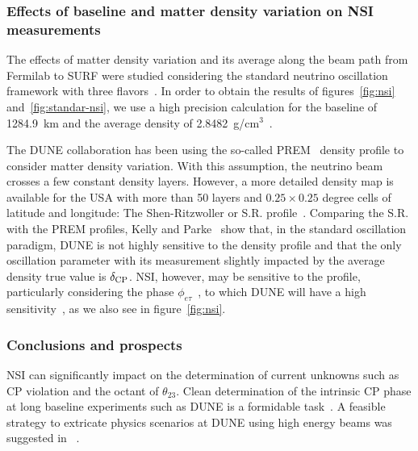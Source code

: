 \subsubsection{Effects of baseline and matter density variation on NSI measurements}\label{ssec:matter}
The effects of matter density variation and its average along the beam path from Fermilab to SURF were studied considering the standard neutrino oscillation framework with three flavors~\cite{Roe:2017zdw,Kelly:2018kmb}. In order to obtain the results of figures~\ref{fig:nsi} and~\ref{fig:standar-nsi}, we use a high precision calculation for the baseline of 1284.9~km and the average density of 2.8482~g/cm$^3$~\cite{Roe:2017zdw}.

The DUNE collaboration has been using the so-called PREM~\cite{Dziewonski:1981xy,PREM2} density profile to consider matter density variation. With this assumption, the neutrino beam crosses a few constant density layers.
However, a more detailed density map is available for the USA with more than 50 layers and $0.25 \times 0.25$ degree cells of latitude and longitude: The Shen-Ritzwoller or S.R. profile~\cite{SR:2016,Roe:2017zdw}. Comparing the S.R. with the PREM profiles, Kelly and Parke~\cite{Kelly:2018kmb} show that, in the standard oscillation paradigm, DUNE is not highly sensitive to the density profile and that the only oscillation parameter with its measurement slightly impacted by the average density true value is $\delta_{\rm CP}$.
NSI, however, may be sensitive to the profile, particularly considering the phase $\phi_{e\tau}$~\cite{Chatterjee:2018dyd}, to which DUNE will have a high sensitivity~\cite{Ohlsson:2012kf,Miranda:2015dra,deGouvea:2015ndi,Coloma:2015kiu,Farzan:2017xzy}, as we also see in figure~\ref{fig:nsi}.

\subsubsection{Conclusions and prospects}
NSI can significantly impact on the determination of current unknowns such as CP violation and the octant of $\theta_{23}$. Clean determination of the intrinsic CP phase at long baseline experiments such as DUNE is a formidable task~\cite{Rout:2017udo}. A feasible strategy to extricate physics scenarios at DUNE using high energy beams was suggested in ~\cite{Masud:2017bcf}.

